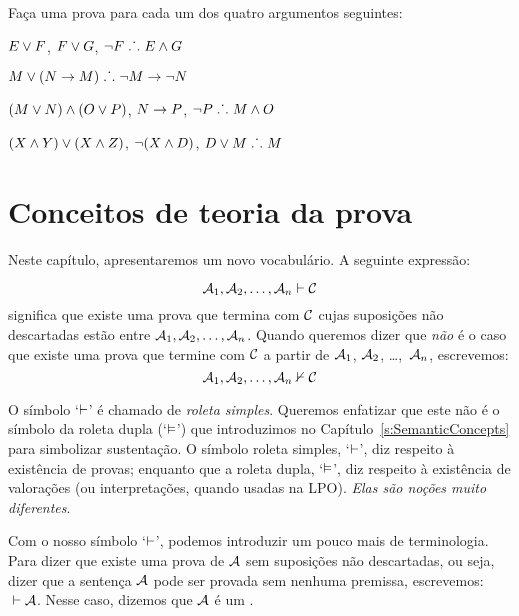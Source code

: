 \problempart 
Faça uma prova para cada um dos quatro argumentos seguintes:
\begin{earg}
\item $E\vee F$, $F\vee G$, $\neg F \mathrel{\ldotp\dot{}\,\ldotp} E \wedge G$
\item $M\vee(N\rightarrow M) \mathrel{\ldotp\dot{}\,\ldotp} \neg M \rightarrow \neg N$
\item $(M \vee N) \wedge (O \vee P)$, $N \rightarrow P$, $\neg P \mathrel{\ldotp\dot{}\,\ldotp} M\wedge O$
\item $(X\wedge Y)\vee(X\wedge Z)$, $\neg(X\wedge D)$, $D\vee M \mathrel{\ldotp\dot{}\,\ldotp} M$
\end{earg}


\chapter{Conceitos de teoria da prova}\label{s:ProofTheoreticConcepts}

 Neste capítulo, apresentaremos um novo vocabulário. A seguinte expressão:
 
$$\mathcal{A}_1, \mathcal{A}_2, \ldots, \mathcal{A}_n \vdash \mathcal{C}$$
significa que existe uma prova que termina com $\mathcal{C}$  cujas suposições não descartadas estão entre $\mathcal{A}_1, \mathcal{A}_2, \ldots, \mathcal{A}_n$. Quando queremos dizer que  \emph{não} é o caso que existe uma prova que termine com $\mathcal{C}$ a partir de $\mathcal{A}_1$, $\mathcal{A}_2$, \dots,~$\mathcal{A}_n$, escrevemos:  $$\mathcal{A}_1, \mathcal{A}_2, \ldots, \mathcal{A}_n \nvdash \mathcal{C}$$  

O símbolo `$\vdash$'  é chamado de  \emph{roleta simples}. Queremos enfatizar que este não é o símbolo da roleta dupla (`$\vDash$') que introduzimos no Capítulo~\ref{s:SemanticConcepts}  para simbolizar sustentação. O símbolo roleta simples, `$\vdash$', diz respeito à existência de provas; enquanto que a roleta dupla, `$\vDash$', diz respeito à existência de valorações (ou interpretações, quando usadas na LPO). \emph{Elas são noções muito diferentes}.

Com o nosso símbolo  `$\vdash$',  podemos introduzir um pouco mais de terminologia. Para dizer que existe uma prova de $\mathcal{A}$ sem suposições não descartadas, ou seja, dizer que a sentença $\mathcal{A}$  pode ser provada sem nenhuma premissa, escrevemos: ${} \vdash \mathcal{A}$. Nesse caso, dizemos que $\mathcal{A}$ é um .

